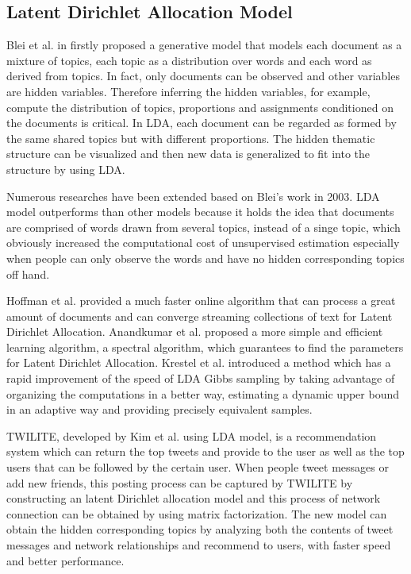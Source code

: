 \subsection{Latent Dirichlet Allocation Model}\label{lda}

Blei et al. in \cite{blei2003latent} firstly proposed a generative model that models each document as a mixture of topics, each topic as a distribution over words and each word as derived from topics. In fact, only documents can be observed and other variables are hidden variables. Therefore inferring the hidden variables, for example, compute the distribution of topics, proportions and assignments conditioned on the documents is critical. In LDA, each document can be regarded as formed by the same shared topics but with different proportions. The hidden thematic structure can be visualized and then new data is generalized to fit into the structure by using LDA. 

Numerous researches have been extended based on Blei's work in 2003. LDA \cite{blei2003latent} model outperforms than other models because it holds the idea that documents are comprised of words drawn from several topics, instead of a singe topic, which obviously increased the computational cost of unsupervised estimation especially when people can only observe the words and have no hidden corresponding topics off hand. 

Hoffman et al. \cite{hoffman2010online} provided a much faster online algorithm that can process a great amount of documents and can converge streaming collections of text for Latent Dirichlet Allocation. Anandkumar et al. \cite{anandkumar2012spectral} proposed a more simple and efficient learning algorithm, a spectral algorithm, which guarantees to find the parameters for Latent Dirichlet Allocation. Krestel et al. \cite{krestel2009latent} introduced a method which has a rapid improvement of the speed of LDA Gibbs sampling by taking advantage of organizing the computations in a better way, estimating a dynamic upper bound in an adaptive way and providing precisely equivalent samples.

TWILITE, developed by Kim et al. \cite{kim2014twilite} using LDA model, is a recommendation system which can return the top tweets and provide to the user as well as the top users that can be followed by the certain user. When people tweet messages or add new friends, this posting process can be captured by TWILITE by constructing an latent Dirichlet allocation model and this process of network connection can be obtained by using matrix factorization. The new model can obtain the hidden corresponding topics  by analyzing both the contents of tweet messages and network relationships  and recommend to users, with faster speed and better performance.

